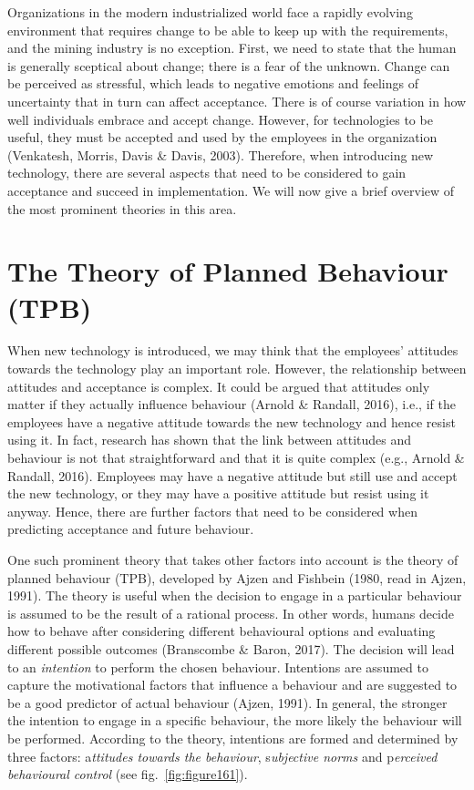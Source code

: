 \documentclass[
  12pt,
]{scrbook}
\begin{document}
Organizations in the modern industrialized world face a rapidly evolving environment that requires change to be able to keep up with the requirements, and the mining industry is no exception. First, we need to state that the human is generally sceptical about change; there is a fear of the unknown. Change can be perceived as stressful, which leads to negative emotions and feelings of uncertainty that in turn can affect acceptance. There is of course variation in how well individuals embrace and accept change. However, for technologies to be useful, they must be accepted and used by the employees in the organization (Venkatesh, Morris, Davis \& Davis, 2003). Therefore, when introducing new technology, there are several aspects that need to be considered to gain acceptance and succeed in implementation. We will now give a brief overview of the most prominent theories in this area.

\hypertarget{the-theory-of-planned-behaviour-tpb}{%
\section{The Theory of Planned Behaviour (TPB)}\label{the-theory-of-planned-behaviour-tpb}}

When new technology is introduced, we may think that the employees' attitudes towards the technology play an important role. However, the relationship between attitudes and acceptance is complex. It could be argued that attitudes only matter if they actually influence behaviour (Arnold \& Randall, 2016), i.e., if the employees have a negative attitude towards the new technology and hence resist using it. In fact, research has shown that the link between attitudes and behaviour is not that straightforward and that it is quite complex (e.g., Arnold \& Randall, 2016). Employees may have a negative attitude but still use and accept the new technology, or they may have a positive attitude but resist using it anyway. Hence, there are further factors that need to be considered when predicting acceptance and future behaviour.~

One such prominent theory that takes other factors into account is the theory of planned behaviour (TPB), developed by Ajzen and Fishbein (1980, read in Ajzen, 1991). The theory is useful when the decision to engage in a particular behaviour is assumed to be the result of a rational process. In other words, humans decide how to behave after considering different behavioural options and evaluating different possible outcomes (Branscombe \& Baron, 2017). The decision will lead to an \emph{intention} to perform the chosen behaviour. Intentions are assumed to capture the motivational factors that influence a behaviour and are suggested to be a good predictor of actual behaviour (Ajzen, 1991). In general, the stronger the intention to engage in a specific behaviour, the more likely the behaviour will be performed. According to the theory, intentions are formed and determined by three factors: a\emph{ttitudes towards the behaviour}, s\emph{ubjective norms} and p\emph{erceived behavioural control} (see fig.~\ref{fig:figure161}).
\end{document}
